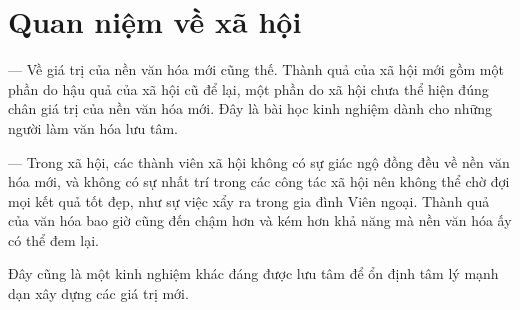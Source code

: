 \section{Quan niệm về xã hội} %
\label{sec:96_97_xa_hoi}

— Về giá trị của nền văn hóa mới cũng thế. Thành quả của xã hội mới gồm một phần do hậu quả của xã hội cũ để lại, một phần do xã hội chưa thể hiện đúng chân giá trị của nền văn hóa mới. Đây là bài học kinh nghiệm dành cho những người làm văn hóa lưu tâm.

— Trong xã hội, các thành viên xã hội không có sự giác ngộ đồng đều về nền văn hóa mới, và không có sự nhất trí trong các công tác xã hội nên không thể chờ đợi mọi kết quả tốt đẹp, như sự việc xẩy ra trong gia đình Viên ngoại. Thành quả của văn hóa bao giờ cũng đến chậm hơn và kém hơn khả năng mà nền văn hóa ấy có thể đem lại.

Đây cũng là một kinh nghiệm khác đáng được lưu tâm để ổn định tâm lý mạnh dạn xây dựng các giá trị mới.
